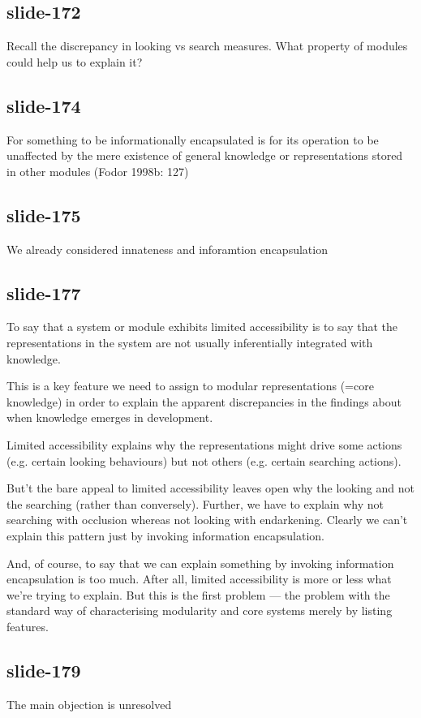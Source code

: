 \documentclass[12pt,\papersize]{extarticle}
\begin{document}
\subsection{slide-172}
Recall the discrepancy in looking vs search measures.
What property of modules could help us to
explain it?

\subsection{slide-174}
For something to be informationally encapsulated is for its operation to be unaffected by the mere existence of general knowledge or representations stored in other modules (Fodor 1998b: 127)

\subsection{slide-175}
We already considered innateness and inforamtion encapsulation

\subsection{slide-177}
To say that a system or module exhibits limited accessibility is to say
that the representations in the system are not usually inferentially
integrated with knowledge.

This is a key feature we need to assign to modular
representations (=core knowledge) in order to explain the apparent
discrepancies in the findings about when knowledge emerges in development.

Limited accessibility explains why the representations might drive
some actions (e.g. certain looking behaviours) but not others (e.g.
certain searching actions).

But't the bare appeal to limited accessibility leaves open why the
looking and not the searching (rather than conversely).
Further, we have to explain why not searching with occlusion
whereas not looking with endarkening.
Clearly we can’t explain this pattern just by invoking information
encapsulation.

And, of course, to say that we can explain something by invoking
information encapsulation is too much.
After all, limited accessibility is more or less what we're trying to explain.
But this is the first problem --- the problem with the standard way of
characterising modularity and core systems merely by listing features.

\subsection{slide-179}
The main objection is unresolved
\end{document}
